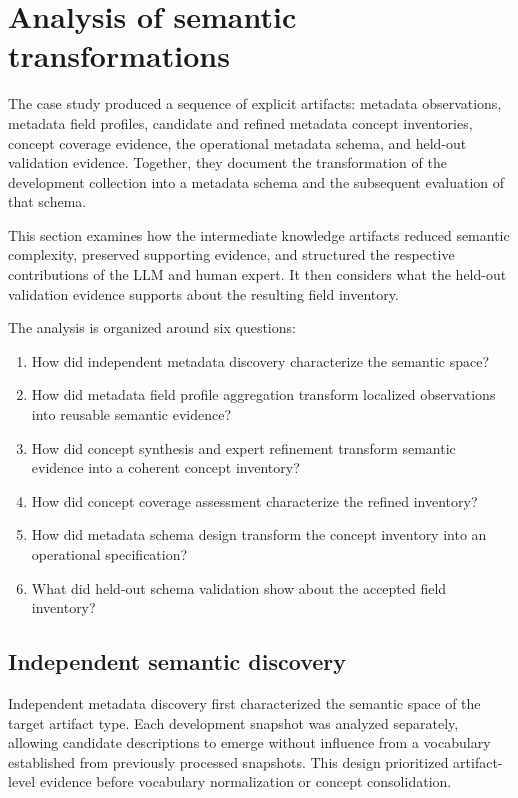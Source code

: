 \documentclass{article}
\begin{document}
\section{Analysis of semantic transformations}

The case study produced a sequence of explicit artifacts: metadata observations, metadata field profiles, candidate and refined metadata concept inventories, concept coverage evidence, the operational metadata schema, and held-out validation evidence. Together, they document the transformation of the development collection into a metadata schema and the subsequent evaluation of that schema.

This section examines how the intermediate knowledge artifacts reduced semantic complexity, preserved supporting evidence, and structured the respective contributions of the LLM and human expert. It then considers what the held-out validation evidence supports about the resulting field inventory.

The analysis is organized around six questions:

\begin{enumerate}
    \item How did independent metadata discovery characterize the semantic space?
    \item How did metadata field profile aggregation transform localized observations into reusable semantic evidence?
    \item How did concept synthesis and expert refinement transform semantic evidence into a coherent concept inventory?
    \item How did concept coverage assessment characterize the refined inventory?
    \item How did metadata schema design transform the concept inventory into an operational specification?
    \item What did held-out schema validation show about the accepted field inventory?
\end{enumerate}

\subsection{Independent semantic discovery}

Independent metadata discovery first characterized the semantic space of the target artifact type. Each development snapshot was analyzed separately, allowing candidate descriptions to emerge without influence from a vocabulary established from previously processed snapshots. This design prioritized artifact-level evidence before vocabulary normalization or concept consolidation.
\end{document}
